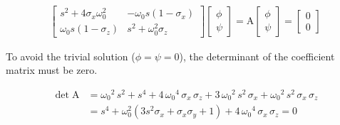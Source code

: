 \begin{eqnarray*}
    \begin{bmatrix}
        s^2+4\sigma_x\omega_0^2 & -\omega_0s(1-\sigma_x)\\
        \omega_0s(1-\sigma_z) & s^2+\omega_0^2\sigma_z
    \end{bmatrix}\begin{bmatrix}
        \phi\\
        \psi
    \end{bmatrix} = \boldsymbol{\mathrm{A}} \begin{bmatrix}
        \phi\\
        \psi
    \end{bmatrix} = \begin{bmatrix}
        0\\0
    \end{bmatrix}
\end{eqnarray*}

To avoid the trivial solution ($\phi = \psi = 0$), the determinant of the coefficient matrix must be zero.

\begin{equation*}
    \begin{split}
        \det \boldsymbol{\mathrm{A}} &= {\omega_0 }^2 \,s^2 +s^4 +4\,{\omega_0 }^4 \,\sigma_x \,\sigma_z +3\,{\omega_0 }^2 \,s^2 \,\sigma_x +{\omega_0 }^2 \,s^2 \,\sigma_x \,\sigma_z \\&= s^4   + \omega_0^2(3s^2\sigma_x + \sigma_x\sigma_y + 1)  +4\,{\omega_0 }^4 \,\sigma_x \,\sigma_z = 0
    \end{split}
\end{equation*}